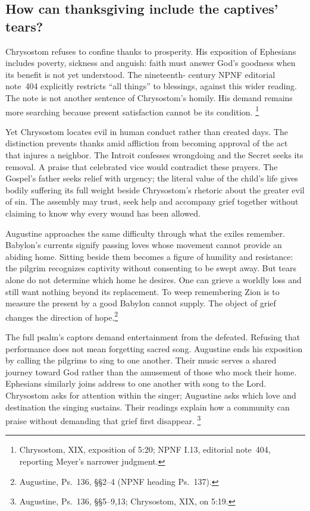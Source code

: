 \subsection{How can thanksgiving include the captives' tears?}
Chrysostom refuses to confine thanks to prosperity. His exposition of
Ephesians includes poverty, sickness and anguish: faith must answer
God's goodness when its benefit is not yet understood. The nineteenth-
century NPNF editorial note~404 explicitly restricts ``all things'' to
blessings, against this wider reading. The note is not another sentence
of Chrysostom's homily. His demand remains more searching because
present satisfaction cannot be its condition.
\footnote{Chrysostom, XIX, exposition of 5:20; NPNF I.13, editorial
note~404, reporting Meyer's narrower judgment.}

Yet Chrysostom locates evil in human conduct rather than created days.
The distinction prevents thanks amid affliction from becoming approval
of the act that injures a neighbor. The Introit confesses wrongdoing
and the Secret seeks its removal. A praise that celebrated vice would
contradict these prayers. The Gospel's father seeks relief with urgency;
the literal value of the child's life gives bodily suffering its full
weight beside Chrysostom's rhetoric about the greater evil of sin.
The assembly may trust, seek help and accompany grief together without
claiming to know why every wound has been allowed.

Augustine approaches the same difficulty through what the exiles
remember. Babylon's currents signify passing loves whose movement
cannot provide an abiding home. Sitting beside them becomes a figure
of humility and resistance: the pilgrim recognizes captivity without
consenting to be swept away. But tears alone do not determine which
home he desires. One can grieve a worldly loss and still want nothing
beyond its replacement. To weep remembering Zion is to measure the
present by a good Babylon cannot supply. The object of grief changes
the direction of hope.\footnote{Augustine, Ps.~136, \S\S2--4
(NPNF heading Ps.~137).}

The full psalm's captors demand entertainment from the defeated.
Refusing that performance does not mean forgetting sacred song.
Augustine ends his exposition by calling the pilgrims to sing to one
another. Their music serves a shared journey toward God rather than
the amusement of those who mock their home. Ephesians similarly joins
address to one another with song to the Lord. Chrysostom asks for
attention within the singer; Augustine asks which love and destination
the singing sustains. Their readings explain how a community can
praise without demanding that grief first disappear.
\footnote{Augustine, Ps.~136, \S\S5--9,13; Chrysostom, XIX, on 5:19.}

